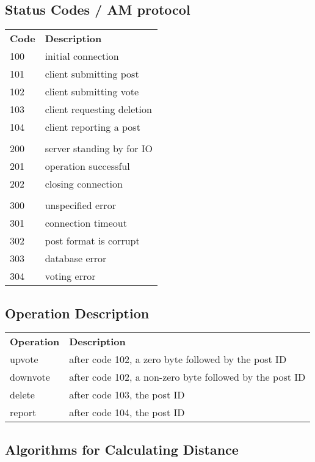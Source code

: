 \documentclass[12pt, a4paper]{article}
\begin{document}
\subsection{Status Codes / AM protocol}
\begin{table}[h]
\centering
\label{my-label}
\begin{tabular}{ll}
\textbf{Code} &\textbf{Description}\\
100 & initial connection\\
101 & client submitting post\\
102 & client submitting vote\\
103 & client requesting deletion\\
104 & client reporting a post\\
&\\
200 & server standing by for IO\\
201 & operation successful\\
202 & closing connection\\
&\\
300 & unspecified error\\
301 & connection timeout\\
302 & post format is corrupt\\
303 & database error\\
304 & voting error\\
\end{tabular}
\end{table}

\subsection{Operation Description}
\begin{table}[h]
\centering
\label{my-label}
\begin{tabular}{ll}
\textbf{Operation} &\textbf{Description}\\
upvote & after code 102, a zero byte followed by the post ID\\
downvote & after code 102, a non-zero byte followed by the post ID\\
delete & after code 103, the post ID\\
report & after code 104, the post ID\\
\end{tabular}
\end{table}

\clearpage
\subsection{Algorithms for Calculating Distance}
\end{document}
